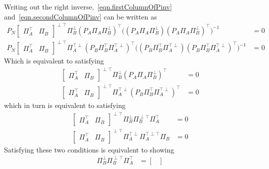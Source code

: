 \begin{proof-dan}
  Writing out the right inverse,\ \eqref{eqn.firstColumnOfPinv} and\ \eqref{eqn.secondColumnOfPinv} can be written as
  \begin{align*}
    P_{N}
    \begin{bmatrix}
      \Pi_{A}^{\top} & \Pi_{B}
    \end{bmatrix}^{\perp\top}
    \Pi_{B}^{\perp}
    (P_{A}\Pi_{A}\Pi_{B}^{\perp})^{\top}
    \bigr(
    (P_{A}\Pi_{A}\Pi_{B}^{\perp})
    (P_{A}\Pi_{A}\Pi_{B}^{\perp})^{\top}
    \bigr)^{-1}
    &= 0 \\
    P_{N}
    \begin{bmatrix}
      \Pi_{A}^{\top} & \Pi_{B}
    \end{bmatrix}^{\perp\top}
    \Pi_{A}^{\top\perp}
    (P_{B}\Pi_{B}^{\top}\Pi_{A}^{\top\perp})^{\top}
    \bigr(
    (P_{B}\Pi_{B}^{\top}\Pi_{A}^{\top\perp})
    (P_{B}\Pi_{B}^{\top}\Pi_{A}^{\top\perp})^{\top}
    \bigr)^{-1}
    &= 0
  \end{align*}
  Which is equivalent to satisfying
  \begin{align*}
    \begin{bmatrix}
      \Pi_{A}^{\top} & \Pi_{B}
    \end{bmatrix}^{\perp\top}
    \Pi_{B}^{\perp}
    (P_{A}\Pi_{A}\Pi_{B}^{\perp})^{\top}
    &= 0 \\
    \begin{bmatrix}
      \Pi_{A}^{\top} & \Pi_{B}
    \end{bmatrix}^{\perp\top}
    \Pi_{A}^{\top\perp}
    (P_{B}\Pi_{B}^{\top}\Pi_{A}^{\top\perp})^{\top}
    &= 0
  \end{align*}
  which in turn is equivalent to satisfying
  \begin{align*}
    \begin{bmatrix}
      \Pi_{A}^{\top} & \Pi_{B}
    \end{bmatrix}^{\perp\top}
    \Pi_{B}^{\perp}\Pi_{B}^{\perp\top}\Pi_{A}^{\top}
    &= 0 \\
    \begin{bmatrix}
      \Pi_{A}^{\top} & \Pi_{B}
    \end{bmatrix}^{\perp\top}
    \Pi_{A}^{\top\perp}\Pi_{A}^{\top\perp\top}\Pi_{B}
    &= 0
  \end{align*}
  Satisfying these two conditions is equivalent to showing
  \begin{align}
    \label{eqn.bunchPisA}
    \Pi_{B}^{\perp}\Pi_{B}^{\perp\top}\Pi_{A}^{\top}
    &=
    \begin{bmatrix}

\end{bmatrix}
\end{align}
\end{proof-dan}
